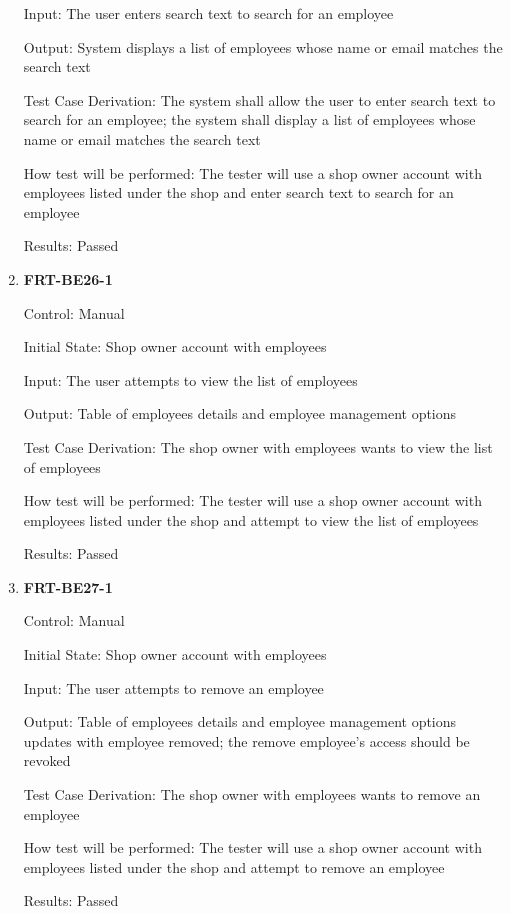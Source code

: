 \documentclass[12pt, titlepage]{article}
\begin{document}
\begin{enumerate}
	      Input: The user enters search text to search for an employee

	      Output: System displays a list of employees whose name or email matches the search text

	      Test Case Derivation: The system shall allow the user to enter search text to search for an
	      employee; the system shall display a list of employees whose name or email matches the search text

	      How test will be performed: The tester will use a shop owner account with employees listed under
	      the shop and enter search text to search for an employee

	      Results: Passed

	\item \textbf{FRT-BE26-1}

	      Control: Manual

	      Initial State: Shop owner account with employees

	      Input: The user attempts to view the list of employees

	      Output: Table of employees details and employee management options

	      Test Case Derivation: The shop owner with employees wants to view the list of employees

	      How test will be performed: The tester will use a shop owner account with employees listed under
	      the shop and attempt to view the list of employees

	      Results: Passed

	\item \textbf{FRT-BE27-1}

	      Control: Manual

	      Initial State: Shop owner account with employees

	      Input: The user attempts to remove an employee

	      Output: Table of employees details and employee management options updates with employee removed;
	      the remove employee's access should be revoked

	      Test Case Derivation: The shop owner with employees wants to remove an employee

	      How test will be performed: The tester will use a shop owner account with employees listed under
	      the shop and attempt to remove an employee

	      Results: Passed

\end{enumerate}
\end{document}
